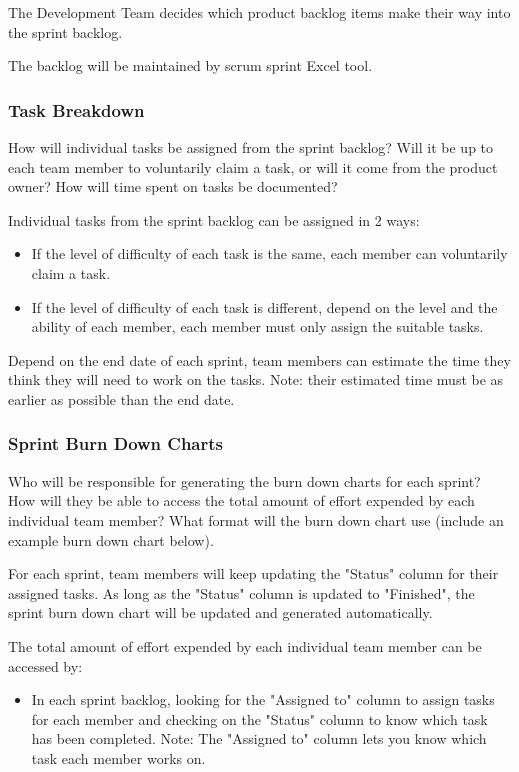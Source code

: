 The Development Team decides which product backlog items make their way into the sprint backlog.

The backlog will be maintained by scrum sprint Excel tool.

\subsubsection{Task Breakdown}
How will individual tasks be assigned from the sprint backlog? Will it be up to each team member to voluntarily claim a task, or will it come from the product owner? How will time spent on tasks be documented?

Individual tasks from the sprint backlog can be assigned in 2 ways: 
\begin{itemize}

\item If the level of difficulty of each task is the same, each member can voluntarily claim a task.

\item If the level of difficulty of each task is different, depend on the level and the ability of each member, each member must only assign the suitable tasks.  

\end{itemize}

Depend on the end date of each sprint, team members can estimate the time they think they will need to work on the tasks. Note: their estimated time must be as earlier as possible than the end date. 

\subsubsection{Sprint Burn Down Charts}
Who will be responsible for generating the burn down charts for each sprint? How will they be able to access the total amount of effort expended by each individual team member? What format will the burn down chart use (include an example burn down chart below).

For each sprint, team members will keep updating the "Status" column for their assigned tasks. As long as the "Status" column is updated to "Finished", the sprint burn down chart will be updated and generated automatically. 

The total amount of effort expended by each individual team member can be accessed by:

\begin{itemize}
    
\item In each sprint backlog, looking for the "Assigned to" column to assign tasks for each member and checking on the "Status" column to know which task has been completed. 
Note: The "Assigned to" column lets you know which task each member works on.

\end{itemize}

